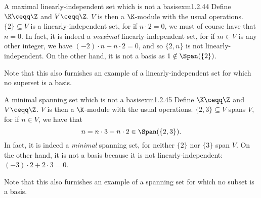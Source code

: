 \begin{exm}{A maximal linearly-independent set which is not a basis}{exm1.2.44}
	Define $\K \ceqq \Z$ and $V\ceqq \Z$.  $V$ is then a $\K$-module with the usual operations.  $\{ 2\} \subseteq V$ is a linearly-independent set, for if $n\cdot 2=0$, we must of course have that $n=0$.  In fact, it is indeed a \emph{maximal} linearly-independent set, for if $m\in V$ is any other integer, we have $(-2)\cdot n+n\cdot 2=0$, and so $\{ 2,n\}$ is not linearly-independent.  On the other hand, it is not a basis as $1\notin \Span (\{ 2\} )$.
	
	Note that this also furnishes an example of a linearly-independent set for which no superset is a basis.
\end{exm}
\begin{exm}{A minimal spanning set which is not a basis}{exm1.2.45}
	Define $\K \ceqq \Z$ and $V\ceqq \Z$.  $V$ is then a $\K$-module with the usual operations.  $\{ 2,3\} \subseteq V$ spans $V$, for if $n\in V$, we have that
	\begin{equation}
	n=n\cdot 3-n\cdot 2\in \Span (\{ 2,3\} ).
	\end{equation}
	In fact, it is indeed a \emph{minimal} spanning set, for neither $\{ 2\}$ nor $\{ 3\}$ span $V$.  On the other hand, it is not a basis because it is not linearly-independent:  $(-3)\cdot 2+2\cdot 3=0$.
	
	Note that this also furnishes an example of a spanning set for which no subset is a basis.
\end{exm}

